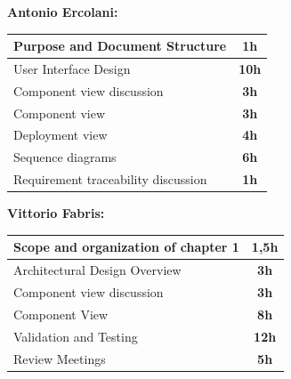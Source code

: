 \documentclass[]{article}
\begin{document}
			\medskip
			\textbf{\large Antonio Ercolani:} \\ \newline
			\begin{tabular}{|l|c|}
				\hline
				\begin{minipage}[t]{10cm}
				Purpose and Document Structure
				\end{minipage} 
				& \textbf{1h} \\ \hline
				\rowcolor[HTML]{DCDCDC} 
				User Interface Design & \textbf{10h} \\ \hline
				Component view discussion & \textbf{3h} \\ \hline
				\rowcolor[HTML]{DCDCDC} 
				Component view & \textbf{3h} \\ \hline
				Deployment view & \textbf{4h} \\ \hline
				\rowcolor[HTML]{DCDCDC} 
				Sequence diagrams & \textbf{6h} \\ \hline
				Requirement traceability discussion & \textbf{1h} \\ \hline
				
			\end{tabular}
			\newline
			\newline
			
			\medskip
			\textbf{\large Vittorio Fabris:} \\ \newline
			\begin{tabular}{|l|c|}
				\hline
				\begin{minipage}[t]{10cm}
					Scope and organization of chapter 1
				\end{minipage} 
				& \textbf{1,5h} \\ \hline
				\rowcolor[HTML]{DCDCDC} 
				 Architectural Design Overview & \textbf{3h} \\ \hline
				 Component view discussion & \textbf{3h} \\ \hline
				\rowcolor[HTML]{DCDCDC} 
				Component View & \textbf{8h} \\ \hline
				Validation and Testing & \textbf{12h} \\ \hline
				\rowcolor[HTML]{DCDCDC} 
				Review Meetings & \textbf{5h} \\ \hline
			\end{tabular}
		\newline \newline
		
\end{document}
